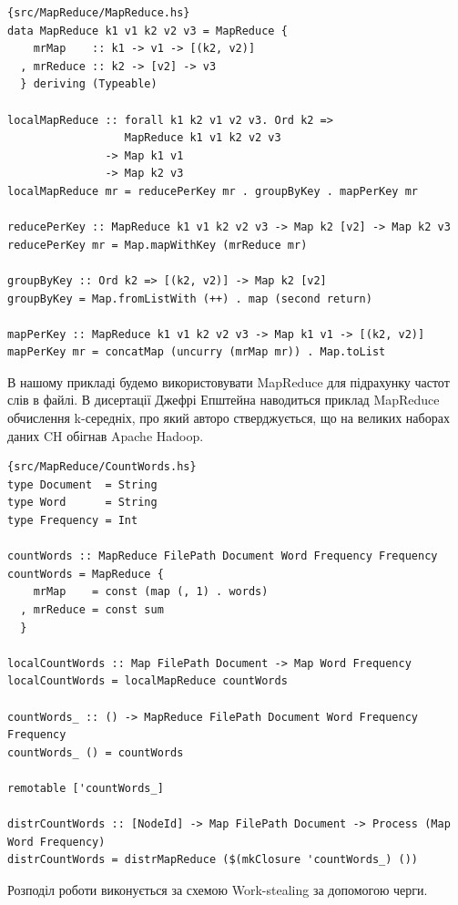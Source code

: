 \documentclass[12pt]{article}
\begin{document}
\begin{lstlisting}{src/MapReduce/MapReduce.hs}
data MapReduce k1 v1 k2 v2 v3 = MapReduce {
    mrMap    :: k1 -> v1 -> [(k2, v2)]
  , mrReduce :: k2 -> [v2] -> v3
  } deriving (Typeable)

localMapReduce :: forall k1 k2 v1 v2 v3. Ord k2 =>
                  MapReduce k1 v1 k2 v2 v3
               -> Map k1 v1
               -> Map k2 v3
localMapReduce mr = reducePerKey mr . groupByKey . mapPerKey mr

reducePerKey :: MapReduce k1 v1 k2 v2 v3 -> Map k2 [v2] -> Map k2 v3
reducePerKey mr = Map.mapWithKey (mrReduce mr)

groupByKey :: Ord k2 => [(k2, v2)] -> Map k2 [v2]
groupByKey = Map.fromListWith (++) . map (second return)

mapPerKey :: MapReduce k1 v1 k2 v2 v3 -> Map k1 v1 -> [(k2, v2)]
mapPerKey mr = concatMap (uncurry (mrMap mr)) . Map.toList
\end{lstlisting}

В нашому прикладі будемо використовувати MapReduce для підрахунку частот слів в файлі.
В дисертації Джефрі Епштейна\cite{epsteinThesis} наводиться приклад MapReduce обчислення k-середніх, 
про який авторо стверджується, що на великих наборах даних CH обігнав Apache Hadoop.\\

\begin{lstlisting}{src/MapReduce/CountWords.hs}
type Document  = String
type Word      = String
type Frequency = Int

countWords :: MapReduce FilePath Document Word Frequency Frequency
countWords = MapReduce {
    mrMap    = const (map (, 1) . words)
  , mrReduce = const sum
  }

localCountWords :: Map FilePath Document -> Map Word Frequency
localCountWords = localMapReduce countWords

countWords_ :: () -> MapReduce FilePath Document Word Frequency Frequency
countWords_ () = countWords

remotable ['countWords_]

distrCountWords :: [NodeId] -> Map FilePath Document -> Process (Map Word Frequency)
distrCountWords = distrMapReduce ($(mkClosure 'countWords_) ())
\end{lstlisting}

Розподіл роботи виконується за схемою Work-stealing за допомогою черги.\\
\end{document}
